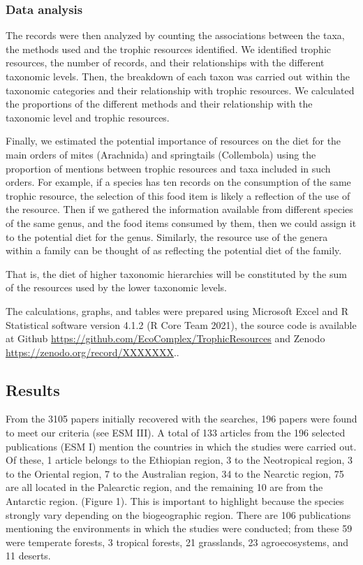 \documentclass[11pt]{article}
\begin{document}
\hypertarget{data-analysis}{%
\subsubsection{Data analysis}\label{data-analysis}}

The records were then analyzed by counting the associations between the
taxa, the methods used and the trophic resources identified. We
identified trophic resources, the number of records, and their
relationships with the different taxonomic levels. Then, the breakdown
of each taxon was carried out within the taxonomic categories and their
relationship with trophic resources. We calculated the proportions of
the different methods and their relationship with the taxonomic level
and trophic resources.

Finally, we estimated the potential importance of resources on the diet
for the main orders of mites (Arachnida) and springtails (Collembola)
using the proportion of mentions between trophic resources and taxa
included in such orders. For example, if a species has ten records on
the consumption of the same trophic resource, the selection of this food
item is likely a reflection of the use of the resource. Then if we
gathered the information available from different species of the same
genus, and the food items consumed by them, then we could assign it to
the potential diet for the genus. Similarly, the resource use of the
genera within a family can be thought of as reflecting the potential
diet of the family.

That is, the diet of higher taxonomic hierarchies will be constituted by
the sum of the resources used by the lower taxonomic levels.

The calculations, graphs, and tables were prepared using Microsoft Excel
and R Statistical software version 4.1.2 (R Core Team 2021), the source
code is available at Github
\url{https://github.com/EcoComplex/TrophicResources} and Zenodo
\url{https://zenodo.org/record/XXXXXXX}..

\hypertarget{results}{%
\subsection{Results}\label{results}}

From the 3105 papers initially recovered with the searches, 196 papers
were found to meet our criteria (see ESM III). A total of 133 articles
from the 196 selected publications (ESM I) mention the countries in
which the studies were carried out. Of these, 1 article belongs to the
Ethiopian region, 3 to the Neotropical region, 3 to the Oriental region,
7 to the Australian region, 34 to the Nearctic region, 75 are all
located in the Palearctic region, and the remaining 10 are from the
Antarctic region. (Figure 1). This is important to highlight because the
species strongly vary depending on the biogeographic region. There are
106 publications mentioning the environments in which the studies were
conducted; from these 59 were temperate forests, 3 tropical forests, 21
grasslands, 23 agroecosystems, and 11 deserts.
\end{document}
